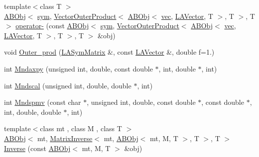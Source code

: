 \begin{DoxyCompactItemize}
\item 
{\footnotesize template$<$class T $>$ }\\\mbox{\hyperlink{classROOT_1_1Minuit2_1_1ABObj}{A\+B\+Obj}}$<$ \mbox{\hyperlink{classROOT_1_1Minuit2_1_1sym}{sym}}, \mbox{\hyperlink{classROOT_1_1Minuit2_1_1VectorOuterProduct}{Vector\+Outer\+Product}}$<$ \mbox{\hyperlink{classROOT_1_1Minuit2_1_1ABObj}{A\+B\+Obj}}$<$ \mbox{\hyperlink{classROOT_1_1Minuit2_1_1vec}{vec}}, \mbox{\hyperlink{classROOT_1_1Minuit2_1_1LAVector}{L\+A\+Vector}}, T $>$, T $>$, T $>$ \mbox{\hyperlink{namespaceROOT_1_1Minuit2_acef6728c8c24759479f97a32d56544f1}{operator-\/}} (const \mbox{\hyperlink{classROOT_1_1Minuit2_1_1ABObj}{A\+B\+Obj}}$<$ \mbox{\hyperlink{classROOT_1_1Minuit2_1_1sym}{sym}}, \mbox{\hyperlink{classROOT_1_1Minuit2_1_1VectorOuterProduct}{Vector\+Outer\+Product}}$<$ \mbox{\hyperlink{classROOT_1_1Minuit2_1_1ABObj}{A\+B\+Obj}}$<$ \mbox{\hyperlink{classROOT_1_1Minuit2_1_1vec}{vec}}, \mbox{\hyperlink{classROOT_1_1Minuit2_1_1LAVector}{L\+A\+Vector}}, T $>$, T $>$, T $>$ \&obj)
\item 
void \mbox{\hyperlink{namespaceROOT_1_1Minuit2_ac07a37ec0cf04b47c95ddc6943487ef2}{Outer\+\_\+prod}} (\mbox{\hyperlink{classROOT_1_1Minuit2_1_1LASymMatrix}{L\+A\+Sym\+Matrix}} \&, const \mbox{\hyperlink{classROOT_1_1Minuit2_1_1LAVector}{L\+A\+Vector}} \&, double f=1.)
\item 
int \mbox{\hyperlink{namespaceROOT_1_1Minuit2_a4784db8e0b280e76eb6f8b00e2b395dd}{Mndaxpy}} (unsigned int, double, const double $\ast$, int, double $\ast$, int)
\item 
int \mbox{\hyperlink{namespaceROOT_1_1Minuit2_a8d430fbbb8b24669bd04e922230451ff}{Mndscal}} (unsigned int, double, double $\ast$, int)
\item 
int \mbox{\hyperlink{namespaceROOT_1_1Minuit2_ad193f5f7fa4c96ebf1fe98c72ab22ca2}{Mndspmv}} (const char $\ast$, unsigned int, double, const double $\ast$, const double $\ast$, int, double, double $\ast$, int)
\item 
{\footnotesize template$<$class mt , class M , class T $>$ }\\\mbox{\hyperlink{classROOT_1_1Minuit2_1_1ABObj}{A\+B\+Obj}}$<$ mt, \mbox{\hyperlink{classROOT_1_1Minuit2_1_1MatrixInverse}{Matrix\+Inverse}}$<$ mt, \mbox{\hyperlink{classROOT_1_1Minuit2_1_1ABObj}{A\+B\+Obj}}$<$ mt, M, T $>$, T $>$, T $>$ \mbox{\hyperlink{namespaceROOT_1_1Minuit2_a47a8185dbf2f2978dedb44abf3ab2e68}{Inverse}} (const \mbox{\hyperlink{classROOT_1_1Minuit2_1_1ABObj}{A\+B\+Obj}}$<$ mt, M, T $>$ \&obj)
\item 

\end{DoxyCompactItemize}
